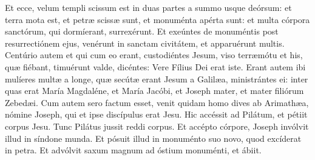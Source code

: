 {{Et ecce, velum templi scissum est in duas partes a summo usque deórsum: et terra mota est, et petræ scissæ sunt, et monuménta apérta sunt: et multa córpora sanctórum, qui dormíerant, surrexérunt. Et exeúntes de monuméntis post resurrectiónem ejus, venérunt in sanctam civitátem, et apparuérunt multis. Centúrio autem et qui cum eo erant, custodiéntes Jesum, viso terræmótu et his, quæ fiébant, timuérunt valde, dicéntes: Vere Fílius Dei erat iste. Erant autem ibi mulíeres multæ a longe, quæ secútæ erant Jesum a Galilæa, ministrántes ei: inter quas erat María Magdaléne, et María Jacóbi, et Joseph mater, et mater filiórum Zebedæi. Cum autem sero factum esset, venit quidam homo dives ab Arimathæa, nómine Joseph, qui et ipse discípulus erat Jesu. Hic accéssit ad Pilátum, et pétiit corpus Jesu. Tunc Pilátus jussit reddi corpus. Et accépto córpore, Joseph invólvit illud in síndone munda. Et pósuit illud in monuménto suo novo, quod excíderat in petra. Et advólvit saxum magnum ad óstium monuménti, et ábiit.
  }
  \e{%
}}
